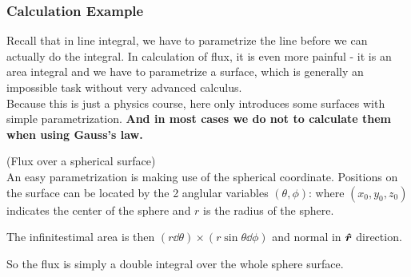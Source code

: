 \documentclass[class=article, crop=false, 12pt]{standalone}
\begin{document}


\subsubsection{Calculation Example}

Recall that in line integral,
we have to parametrize the line before we can actually do the integral.
In calculation of flux, it is even more painful - 
it is an area integral and we have to parametrize a surface,
which is generally an impossible task without very advanced calculus.\\

Because this is just a physics course, 
here only introduces some surfaces with simple parametrization.
\bf{And in most cases we do not to calculate them when using Gauss's law.}

\begin{example}
    (Flux over a spherical surface)\\
    An easy parametrization is making use of the spherical coordinate.
    Positions on the surface can be located by the 2 anglular variables $(\theta,\phi)$:
    where $(x_0,y_0,z_0)$ indicates the center of the sphere and $r$ is the radius of the sphere.
    
    
    The infinitestimal area is then $(r\dd{\theta})\times(r\sin\theta\dd{\phi})$
    and normal in $\vu*{r}$ direction.

    So the flux is simply a double integral over the whole sphere surface.

\end{example}
\end{document}
